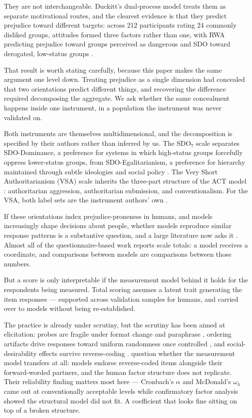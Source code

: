 \documentclass{article}
\begin{document}
They are not interchangeable. Duckitt's dual-process model \citep{duckitt2001,duckittsibley2010} treats them as separate motivational routes, and the clearest evidence is that they predict prejudice toward different targets: across 212 participants rating 24 commonly disliked groups, attitudes formed three factors rather than one, with RWA predicting prejudice toward groups perceived as dangerous and SDO toward derogated, low-status groups \citep{duckitt2007,asbrock2010,perry2013}.

That result is worth stating carefully, because this paper makes the same argument one level down. Treating prejudice as a single dimension had concealed that two orientations predict different things, and recovering the difference required decomposing the aggregate. We ask whether the same concealment happens inside one instrument, in a population the instrument was never validated on.

Both instruments are themselves multidimensional, and the decomposition is specified by their authors rather than inferred by us. The SDO$_7$ scale separates SDO-Dominance, a preference for systems in which high-status groups forcefully oppress lower-status groups, from SDO-Egalitarianism, a preference for hierarchy maintained through subtle ideologies and social policy \citep{ho2015}. The Very Short Authoritarianism (VSA) scale inherits the three-part structure of the ACT model \citep{duckitt2010act,duckitt2013}: authoritarian aggression, authoritarian submission, and conventionalism. For the VSA, both label sets are the instrument authors' own \citep{bizumic2018}.

If these orientations index prejudice-proneness in humans, and models increasingly shape decisions about people, whether models reproduce similar response patterns is a substantive question, and a large literature now asks it \citep{hartmann2023,motoki2024,rozado2024,feng2023,buyl2026,lukasik2026,pellert2024}. Almost all of the questionnaire-based work reports scale totals: a model receives a coordinate, and comparisons between models are comparisons between those numbers.

But a score is only interpretable if the measurement model behind it holds for the respondents being measured. Total scoring assumes a latent trait generating the item responses --- supported across validation samples for humans, and carried over to models without being re-established.

The practice is already under scrutiny, but the scrutiny has been aimed at elicitation: probes are fragile under format change and paraphrase \citep{rottger2024}, ordering artifacts drive responses toward uniform randomness once controlled \citep{dominguezolmedo2024}, and social-desirability effects survive reverse-coding \citep{salecha2024}. \citet{suhr2025} question whether the measurement model transfers at all: models endorse reverse-coded items alongside their forward-worded partners, and the human factor structure does not replicate. Their reliability finding matters most here --- Cronbach's $\alpha$ and McDonald's $\omega_h$ came out at conventionally acceptable levels while confirmatory factor analysis showed the structural model did not fit. A coefficient that looks fine sitting on top of a broken structure.
\end{document}
